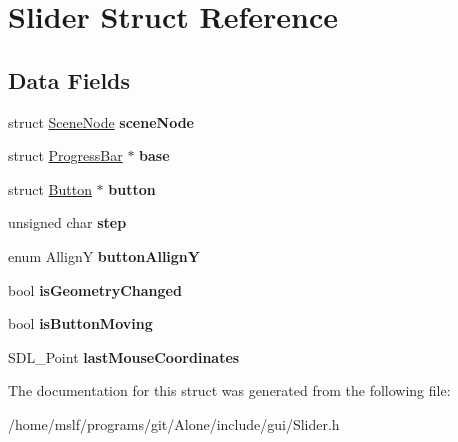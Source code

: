 \hypertarget{struct_slider}{}\section{Slider Struct Reference}
\label{struct_slider}
\subsection*{Data Fields}
\begin{DoxyCompactItemize}
\item 
\hypertarget{struct_slider_aca8025f56fb4ce20b974ec9a3292a9e4}{}\label{struct_slider_aca8025f56fb4ce20b974ec9a3292a9e4} 
struct \hyperlink{struct_scene_node}{Scene\+Node} {\bfseries scene\+Node}
\item 
\hypertarget{struct_slider_a686905c1a3f09ace5f334088ada4ee71}{}\label{struct_slider_a686905c1a3f09ace5f334088ada4ee71} 
struct \hyperlink{struct_progress_bar}{Progress\+Bar} $\ast$ {\bfseries base}
\item 
\hypertarget{struct_slider_ae7aee5d2fea3fa9c160fcb9341275053}{}\label{struct_slider_ae7aee5d2fea3fa9c160fcb9341275053} 
struct \hyperlink{struct_button}{Button} $\ast$ {\bfseries button}
\item 
\hypertarget{struct_slider_ae3ee46455ae318e5d8b789e5b47d2d58}{}\label{struct_slider_ae3ee46455ae318e5d8b789e5b47d2d58} 
unsigned char {\bfseries step}
\item 
\hypertarget{struct_slider_acc6bbbef7fde96fcba69e9befa298799}{}\label{struct_slider_acc6bbbef7fde96fcba69e9befa298799} 
enum AllignY {\bfseries button\+AllignY}
\item 
\hypertarget{struct_slider_a8ea7e8ac3e3330830aa7a4309390f3ac}{}\label{struct_slider_a8ea7e8ac3e3330830aa7a4309390f3ac} 
bool {\bfseries is\+Geometry\+Changed}
\item 
\hypertarget{struct_slider_a5046816c8ca0b6b9c5948de82c1cbc44}{}\label{struct_slider_a5046816c8ca0b6b9c5948de82c1cbc44} 
bool {\bfseries is\+Button\+Moving}
\item 
\hypertarget{struct_slider_a521d68392d4b01394621624b94ce06f7}{}\label{struct_slider_a521d68392d4b01394621624b94ce06f7} 
S\+D\+L\+\_\+\+Point {\bfseries last\+Mouse\+Coordinates}
\end{DoxyCompactItemize}


The documentation for this struct was generated from the following file\+:\begin{DoxyCompactItemize}
\item 
/home/mslf/programs/git/\+Alone/include/gui/Slider.\+h\end{DoxyCompactItemize}
